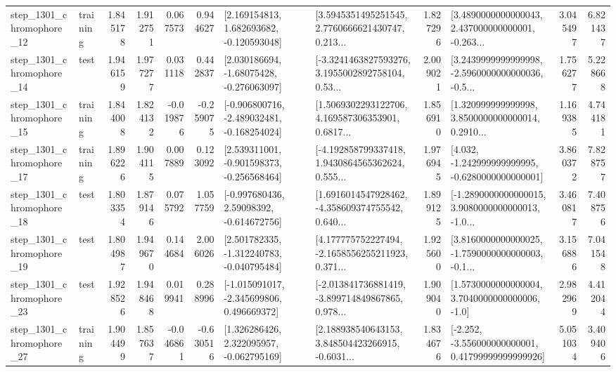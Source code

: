 \begin{tabular}{llrrrrllrlrr}
 step\_1301\_chromophore\_12 &  training &      1.845178 &    1.912751 &      0.067573 &  0.944627 &    [2.169154813, 1.682693682, -0.120593048] &  [3.5945351495251545, 2.7760666621430747, 0.213... &       1.827296 &  [3.4890000000000043, 2.437000000000001, -0.263... &            3.045497 &          6.821437 \\
 step\_1301\_chromophore\_14 &      test &      1.946159 &    1.977277 &      0.031118 &  0.442837 &    [2.030186694, -1.68075428, -0.276063097] &  [-3.3241463827593276, 3.1955002892758104, 0.53... &       2.009021 &  [3.2439999999999998, -2.5960000000000036, -0.5... &            1.756277 &          5.228668 \\
 step\_1301\_chromophore\_15 &  training &      1.844008 &    1.824132 &     -0.019876 & -0.259075 &  [-0.906800716, -2.489032481, -0.168254024] &  [1.5069302293122706, 4.169587306353901, 0.6817... &       1.856910 &  [1.320999999999998, 3.8500000000000014, 0.2910... &            1.169385 &          4.744181 \\
 step\_1301\_chromophore\_17 &  training &      1.896226 &    1.904115 &      0.007889 &  0.123092 &   [2.539311001, -0.901598373, -0.256568464] &  [-4.192858799337418, 1.9430864565362624, 0.555... &       1.976945 &   [4.032, -1.242999999999995, -0.6280000000000001] &            3.860372 &          7.828757 \\
 step\_1301\_chromophore\_18 &      test &      1.803354 &    1.879146 &      0.075792 &  1.057759 &    [-0.997680436, 2.59098392, -0.614672756] &  [1.6916014547928462, -4.358609374755542, 0.640... &       1.899125 &  [-1.2890000000000015, 3.9080000000000013, -1.0... &            3.460817 &          7.408756 \\
 step\_1301\_chromophore\_19 &      test &      1.804987 &    1.949670 &      0.144684 &  2.006026 &   [2.501782335, -1.312240783, -0.040795484] &  [4.177775752227494, -2.1658556255211923, 0.371... &       1.925600 &  [3.8160000000000025, -1.7590000000000003, -0.1... &            3.156886 &          7.041548 \\
 step\_1301\_chromophore\_23 &      test &      1.928526 &    1.948468 &      0.019941 &  0.288996 &   [-1.015091017, -2.345699806, 0.496669372] &  [-2.013841736881419, -3.899714849867865, 0.978... &       1.909040 &     [1.5730000000000004, 3.7040000000000006, -1.0] &            2.982969 &          4.412044 \\
 step\_1301\_chromophore\_27 &  training &      1.904499 &    1.857637 &     -0.046861 & -0.630516 &    [1.326286426, 2.322095957, -0.062795169] &  [2.188938540643153, 3.848504423266915, -0.6031... &       1.834676 &  [-2.252, -3.556000000000001, 0.41799999999999926] &            5.051034 &          3.409406 \\

\end{tabular}
